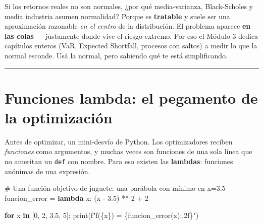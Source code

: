 \documentclass[
  spanish,
  letterpaper,
  DIV=11,
  numbers=noendperiod]{scrreprt}
\newenvironment{Shaded}{\begin{snugshade}}{\end{snugshade}}
\newcommand{\BuiltInTok}[1]{\textcolor[rgb]{0.00,0.23,0.31}{#1}}
\newcommand{\CommentTok}[1]{\textcolor[rgb]{0.37,0.37,0.37}{#1}}
\newcommand{\ControlFlowTok}[1]{\textcolor[rgb]{0.00,0.23,0.31}{\textbf{#1}}}
\newcommand{\DecValTok}[1]{\textcolor[rgb]{0.68,0.00,0.00}{#1}}
\newcommand{\FloatTok}[1]{\textcolor[rgb]{0.68,0.00,0.00}{#1}}
\newcommand{\KeywordTok}[1]{\textcolor[rgb]{0.00,0.23,0.31}{\textbf{#1}}}
\newcommand{\NormalTok}[1]{\textcolor[rgb]{0.00,0.23,0.31}{#1}}
\newcommand{\OperatorTok}[1]{\textcolor[rgb]{0.37,0.37,0.37}{#1}}
\newcommand{\SpecialCharTok}[1]{\textcolor[rgb]{0.37,0.37,0.37}{#1}}
\newcommand{\SpecialStringTok}[1]{\textcolor[rgb]{0.13,0.47,0.30}{#1}}
\begin{document}
\begin{tcolorbox}[enhanced jigsaw, bottomrule=.15mm, colback=white, opacitybacktitle=0.6, arc=.35mm, toprule=.15mm, opacityback=0, breakable, titlerule=0mm, left=2mm, coltitle=black, colbacktitle=quarto-callout-warning-color!10!white, colframe=quarto-callout-warning-color-frame, leftrule=.75mm, toptitle=1mm, bottomtitle=1mm, title=\textcolor{quarto-callout-warning-color}{\faExclamationTriangle}\hspace{0.5em}{¿Y entonces por qué usamos la normal?}, rightrule=.15mm]

Si los retornos reales no son normales, ¿por qué media-varianza,
Black-Scholes y media industria asumen normalidad? Porque es
\textbf{tratable} y suele ser una aproximación razonable \emph{en el
centro} de la distribución. El problema aparece \textbf{en las colas}
--- justamente donde vive el riesgo extremo. Por eso el Módulo 3 dedica
capítulos enteros (VaR, Expected Shortfall, procesos con saltos) a medir
lo que la normal esconde. Usá la normal, pero sabiendo qué te está
simplificando.

\end{tcolorbox}

\begin{center}\rule{0.5\linewidth}{0.5pt}\end{center}

\chapter{Funciones lambda: el pegamento de la
optimización}\label{funciones-lambda-el-pegamento-de-la-optimizaciuxf3n}

Antes de optimizar, un mini-desvío de Python. Los optimizadores reciben
\emph{funciones} como argumentos, y muchas veces son funciones de una
sola línea que no ameritan un \texttt{def} con nombre. Para eso existen
las \textbf{lambdas}: funciones anónimas de una expresión.

\label{lambda}
\begin{Shaded}
\begin{Highlighting}[]
\CommentTok{\# Una función objetivo de juguete: una parábola con mínimo en x=3.5}
\NormalTok{funcion\_error }\OperatorTok{=} \KeywordTok{lambda}\NormalTok{ x: (x }\OperatorTok{{-}} \FloatTok{3.5}\NormalTok{) }\OperatorTok{**} \DecValTok{2} \OperatorTok{+} \DecValTok{2}

\ControlFlowTok{for}\NormalTok{ x }\KeywordTok{in}\NormalTok{ [}\DecValTok{0}\NormalTok{, }\DecValTok{2}\NormalTok{, }\FloatTok{3.5}\NormalTok{, }\DecValTok{5}\NormalTok{]:}
    \BuiltInTok{print}\NormalTok{(}\SpecialStringTok{f"f(}\SpecialCharTok{\{}\NormalTok{x}\SpecialCharTok{\}}\SpecialStringTok{) = }\SpecialCharTok{\{}\NormalTok{funcion\_error(x)}\SpecialCharTok{:.2f\}}\SpecialStringTok{"}\NormalTok{)}
\end{Highlighting}
\end{Shaded}
\end{document}
